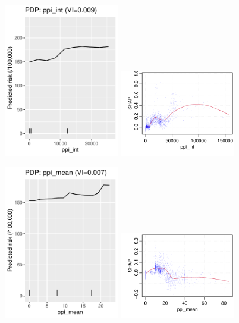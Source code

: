 \documentclass[12pt]{article}
\begin{document}
\begin{figure}[h]
\centering
\includegraphics[width=0.45\textwidth]{figures/pdp/ppi_int.pdf}
\includegraphics[width=0.45\textwidth]{figures/shap/ppi_int.pdf}
\end{figure}
\begin{figure}[h]
\centering
\includegraphics[width=0.45\textwidth]{figures/pdp/ppi_mean.pdf}
\includegraphics[width=0.45\textwidth]{figures/shap/ppi_mean.pdf}
\end{figure}
\end{document}
